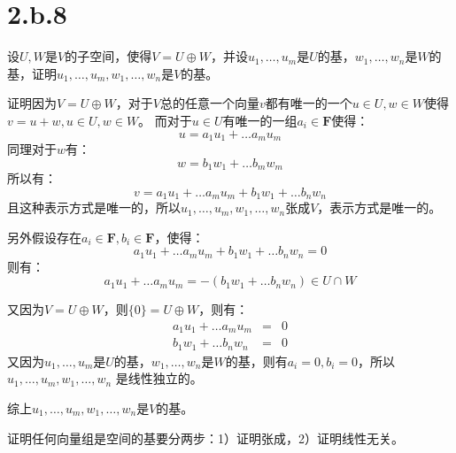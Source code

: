 \documentclass[10pt,a4paper,UTF8]{article}
\begin{document}
\section*{2.b.8}
\label{sec:orgd4a54fa}


\begin{problem}
设\(U,W\)是\(V\)的子空间，使得\(V=U\oplus W\)，并设\(u_{1},\ldots ,u_{m}\)是\(U\)的基，\(w_{1},\ldots ,w_{n}\)是\(W\)的基，证明\(u_{1},\ldots ,u_{m},w_{1},\ldots ,w_{n}\)是\(V\)的基。
\end{problem}

\begin{answer}
证明因为\(V=U\oplus W\)，对于\(V\)总的任意一个向量\(v\)都有唯一的一个\(u\in U,w\in W\)使得\(v = u+w,u\in U, w\in W\)。 而对于\(u\in U\)有唯一的一组\(a_{i}\in \mathbf{F}\)使得：
\begin{equation}
\label{eq:5}
u = a_{1}u_{1}+\ldots a_{m}u_{m}
\end{equation}
同理对于\(w\)有：
\begin{equation}
\label{eq:6}
w = b_{1}w_{1}+\ldots b_{m}w_{m}
\end{equation}
所以有：
\begin{equation}
\label{eq:7}
v = a_{1}u_{1}+\ldots a_{m}u_{m} + b_{1}w_{1}+\ldots b_{n}w_{n}
\end{equation}
且这种表示方式是唯一的，所以\(u_{1},\ldots ,u_{m},w_{1},\ldots ,w_{n}\)张成\(V\)，表示方式是唯一的。

另外假设存在\(a_{i}\in \mathbf{F},b_{i} \in \mathbf{F}\)，使得：
\begin{equation}
\label{eq:8}
 a_{1}u_{1}+\ldots a_{m}u_{m} + b_{1}w_{1}+\ldots b_{n}w_{n} = 0
\end{equation}
则有：
\begin{equation}
\label{eq:9}
 a_{1}u_{1}+\ldots a_{m}u_{m} = -( b_{1}w_{1}+\ldots b_{n}w_{n}) \in U\cap W
\end{equation}

又因为\(V=U\oplus W\)，则\(\{0\} = U\oplus W\)，则有：
\begin{eqnarray*}
 a_{1}u_{1}+\ldots a_{m}u_{m} &=&0\\
b_{1}w_{1}+\ldots b_{n}w_{n} &=&0
\end{eqnarray*}
又因为\(u_{1},\ldots ,u_{m}\)是\(U\)的基，\(w_{1},\ldots ,w_{n}\)是\(W\)的基，则有\(a_{i}=0,b_{i}=0\)，所以\(u_{1},\ldots ,u_{m},w_{1},\ldots ,w_{n}\) 是线性独立的。

综上\(u_{1},\ldots ,u_{m},w_{1},\ldots ,w_{n}\)是\(V\)的基。

证明任何向量组是空间的基要分两步：1）证明张成，2）证明线性无关。
\end{answer}
\end{document}

